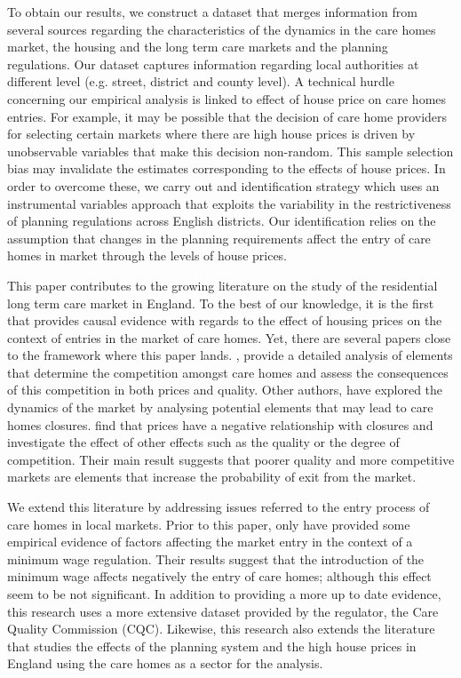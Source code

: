 \documentclass[12pt,letterpaper]{article}
\begin{document}
To obtain our results, we construct a dataset that merges information from several sources regarding the characteristics 
of the dynamics in the care homes market, the housing and the long term care markets and the planning regulations. 
Our dataset captures information regarding local authorities 
 at different level (e.g. street, district and county level). A technical hurdle concerning our empirical analysis is 
 linked to effect of house price on care homes entries. For example, it may be possible that the decision of care home providers 
 for selecting certain markets where there are high house prices is driven by unobservable variables
  that make this decision non-random. This sample selection bias may invalidate the estimates corresponding
    to the effects of house prices. In order to overcome these, we carry out and identification strategy which 
    uses an instrumental variables approach that exploits the variability in the restrictiveness of planning
     regulations across English districts. Our identification relies on the assumption that changes in the planning
      requirements affect the entry of care homes in market through the levels of house prices. 

      
This paper contributes to the growing literature on the study of the residential long term 
care market in England. To the best of our knowledge, it is the first that provides causal evidence with
 regards to the effect of housing prices on the context of entries in the market of care 
 homes. Yet, there are several  papers close to the framework where this paper lands. \citet{forder2014}, provide
 a detailed analysis of elements that determine the competition 
 amongst care homes and assess the 
  consequences of this competition in both prices and quality. Other authors, have explored the dynamics of the market
  by analysing potential elements that may lead to care homes closures. \citet{netten2003, netten2005care} find that prices have 
  a negative relationship with closures and \citet{allan2015} investigate the effect of other effects such as the quality or the degree 
  of competition. Their main result suggests that poorer quality and more competitive markets are elements that increase
  the probability of exit from the market.   
 
 We extend this literature by addressing issues referred to the entry process of care homes in local markets. 
  Prior to this paper, only \cite{machin2002minimum} have provided some empirical evidence of factors affecting the market
   entry in the context of a minimum wage regulation. Their results suggest that the introduction of the minimum wage
   affects negatively the entry of care homes; although this effect seem to be not significant.
   In addition to providing a more up to date
    evidence, this research uses a more extensive dataset provided by the regulator, the
     Care Quality Commission (CQC). Likewise, this research also extends the literature that studies the effects 
     of the planning system and the high house prices in England using the care homes as a sector
      for the analysis. 
      
\end{document}
